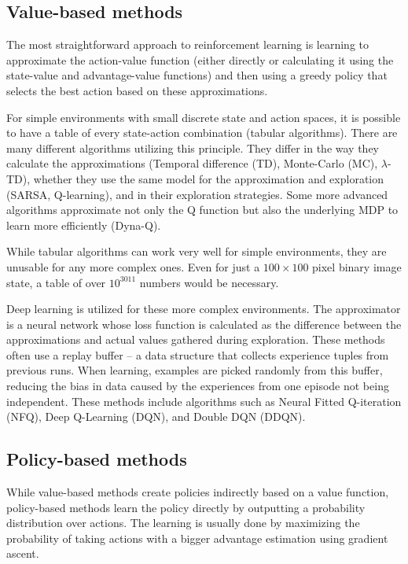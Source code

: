 \documentclass[
  digital,     %
  oneside,     %
  nosansbold,  %
  nocolorbold, %
  lof,         %
  lot,         %
]{fithesis4}
\begin{document}
\subsection{Value-based methods}
\label{subsec:value-based-methods}

The most straightforward approach to reinforcement learning is learning to approximate the action-value function (either directly or calculating it using the state-value and advantage-value functions) and then using a greedy policy that selects the best action based on these approximations.

For simple environments with small discrete state and action spaces, it is possible to have a table of every state-action combination (tabular algorithms). There are many different algorithms utilizing this principle. They differ in the way they calculate the approximations (Temporal difference (TD), Monte-Carlo (MC), $\lambda$-TD), whether they use the same model for the approximation and exploration (SARSA, Q-learning), and in their exploration strategies. Some more advanced algorithms approximate not only the Q function but also the underlying MDP to learn more efficiently (Dyna-Q).

While tabular algorithms can work very well for simple environments, they are unusable for any more complex ones. Even for just a $100 \times 100$ pixel binary image state, a table of over $10^{3011}$ numbers would be necessary.

Deep learning is utilized for these more complex environments. The approximator is a neural network whose loss function is calculated as the difference between the approximations and actual values gathered during exploration. These methods often use a replay buffer -- a data structure that collects experience tuples from previous runs. When learning, examples are picked randomly from this buffer, reducing the bias in data caused by the experiences from one episode not being independent. These methods include algorithms such as Neural Fitted Q-iteration (NFQ), Deep Q-Learning (DQN), and Double DQN (DDQN).

\subsection{Policy-based methods}

While value-based methods create policies indirectly based on a value function, policy-based methods learn the policy directly by outputting a probability distribution over actions. The learning is usually done by maximizing the probability of taking actions with a bigger advantage estimation using gradient ascent.
\end{document}
